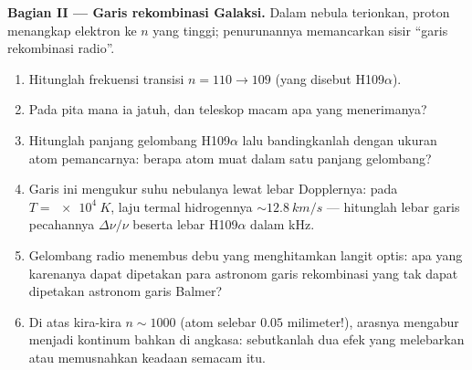 \begin{problem}
\medskip\noindent\textbf{Bagian II --- Garis rekombinasi
Galaksi.}
Dalam nebula terionkan, proton menangkap elektron ke $n$ yang tinggi;
penurunannya memancarkan sisir ``garis rekombinasi radio''.
\begin{enumerate}[resume]
  \item Hitunglah frekuensi transisi $n = 110 \to 109$
        (yang disebut H109$\alpha$).
  \item Pada pita mana ia jatuh, dan teleskop macam apa yang
        menerimanya?
  \item Hitunglah panjang gelombang H109$\alpha$ lalu bandingkanlah
        dengan ukuran atom pemancarnya: berapa atom muat dalam satu
        panjang gelombang?
  \item Garis ini mengukur suhu nebulanya lewat lebar Dopplernya: pada
        $T = \qty{e4}{K}$, laju termal hidrogennya
        $\sim\qty{12.8}{km/s}$ --- hitunglah lebar garis pecahannya
        $\Delta\nu/\nu$ beserta lebar H109$\alpha$ dalam kHz.
  \item Gelombang radio menembus debu yang menghitamkan langit optis:
        apa yang karenanya dapat dipetakan para astronom garis
        rekombinasi yang tak dapat dipetakan astronom garis Balmer?
  \item Di atas kira-kira $n \sim 1000$ (atom selebar $0.05$ milimeter!),
        arasnya mengabur menjadi kontinum bahkan di angkasa:
        sebutkanlah dua efek yang melebarkan atau memusnahkan keadaan
        semacam itu.
\end{enumerate}


\end{problem}
